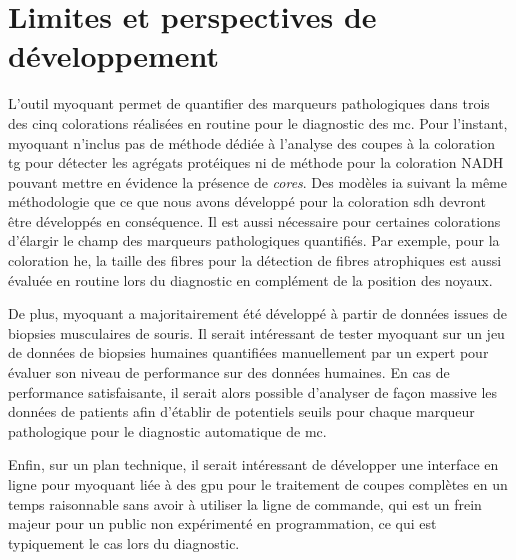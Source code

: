 \section{Limites et perspectives de développement}
L'outil \gls{myoquant} permet de quantifier des marqueurs pathologiques dans trois des cinq colorations réalisées en routine pour le diagnostic des \gls{mc}. Pour l'instant, \gls{myoquant} n'inclus pas de méthode dédiée à l'analyse des coupes à la coloration \gls{tg} pour détecter les agrégats protéiques ni de méthode pour la coloration NADH pouvant mettre en évidence la présence de \textit{cores}. Des modèles \gls{ia} suivant la même méthodologie que ce que nous avons développé pour la coloration \gls{sdh} devront être développés en conséquence. Il est aussi nécessaire pour certaines colorations d'élargir le champ des marqueurs pathologiques quantifiés. Par exemple, pour la coloration \gls{he}, la taille des fibres pour la détection de fibres atrophiques est aussi évaluée en routine lors du diagnostic en complément de la position des noyaux.

De plus, \gls{myoquant} a majoritairement été développé à partir de données issues de biopsies musculaires de souris. Il serait intéressant de tester \gls{myoquant} sur un jeu de données de biopsies humaines quantifiées manuellement par un expert pour évaluer son niveau de performance sur des données humaines. En cas de performance satisfaisante, il serait alors possible d'analyser de façon massive les données de patients afin d'établir de potentiels seuils pour chaque marqueur pathologique pour le diagnostic automatique de \gls{mc}.

 Enfin, sur un plan technique, il serait intéressant de développer une interface en ligne pour \gls{myoquant} liée à des \gls{gpu} pour le traitement de coupes complètes en un temps raisonnable sans avoir à utiliser la ligne de commande, qui est un frein majeur pour un public non expérimenté en programmation, ce qui est typiquement le cas lors du diagnostic.